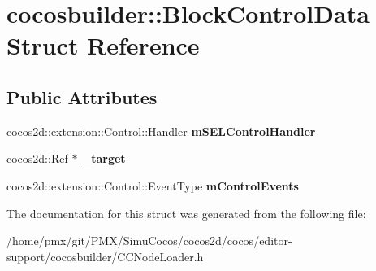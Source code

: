 \hypertarget{structcocosbuilder_1_1BlockControlData}{}\section{cocosbuilder\+:\+:Block\+Control\+Data Struct Reference}
\label{structcocosbuilder_1_1BlockControlData}
\subsection*{Public Attributes}
\begin{DoxyCompactItemize}
\item 
\mbox{\label{structcocosbuilder_1_1BlockControlData_a4626c61fda061b0283de3b23bab514e5}} 
cocos2d\+::extension\+::\+Control\+::\+Handler {\bfseries m\+S\+E\+L\+Control\+Handler}
\item 
\mbox{\label{structcocosbuilder_1_1BlockControlData_a7c9a810a6850b80b0a8688a88af71f5b}} 
cocos2d\+::\+Ref $\ast$ {\bfseries \+\_\+target}
\item 
\mbox{\label{structcocosbuilder_1_1BlockControlData_a10b3f35b47ebcb0b4e5d592d774dbbe2}} 
cocos2d\+::extension\+::\+Control\+::\+Event\+Type {\bfseries m\+Control\+Events}
\end{DoxyCompactItemize}


The documentation for this struct was generated from the following file\+:\begin{DoxyCompactItemize}
\item 
/home/pmx/git/\+P\+M\+X/\+Simu\+Cocos/cocos2d/cocos/editor-\/support/cocosbuilder/C\+C\+Node\+Loader.\+h\end{DoxyCompactItemize}
